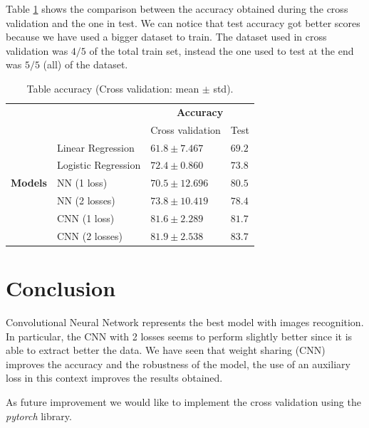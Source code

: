 \documentclass[journal, a4paper]{IEEEtran}
\begin{document}
Table \ref{table:accuracy} shows the comparison between the accuracy obtained during the cross validation and the one in test. We can notice that test accuracy got better scores because we have used a bigger dataset to train. The dataset used in cross validation was $4/5$ of the total train set, instead the one used to test at the end was $5/5$ (all) of the dataset.
\begin{table}
\centering
\caption{Table accuracy (Cross validation: mean $\pm$ std).}
\label{table:accuracy}
\begin{tabular}{|l|l|l|l|} 
\cline{3-4}
\multicolumn{1}{l}{} &                     & \multicolumn{2}{c|}{\textbf{Accuracy}}  \\ 
\cline{3-4}
\multicolumn{1}{l}{} &                     & Cross validation & Test                 \\ 
\hline
                     & Linear Regression   & $61.8\pm7.467$    & $69.2$                 \\ 
\cline{2-4}
     & Logistic Regression & $72.4 \pm0.860$    & $73.8$                 \\ 
\cline{2-4}
\textbf{Models}    & NN (1 loss)~        & $70.5 \pm12.696$   & $80.5$                 \\ 
\cline{2-4}
                     & NN (2 losses)~      & $73.8 \pm10.419$   & $78.4$                 \\ 
\cline{2-4}
                     & CNN (1 loss)~       & $81.6 \pm2.289$    & $81.7$                 \\ 
\cline{2-4}
                     & CNN (2 losses)      & $81.9 \pm2.538$    & $83.7$                 \\
\hline
\end{tabular}
\end{table}

\section{Conclusion}
\label{sec:conclusion}
Convolutional Neural Network represents the best model with images recognition. In particular, the CNN with 2 losses seems to perform slightly better since it is able to extract better the data. We have seen that weight sharing (CNN) improves the accuracy and the robustness of the model, the use of an auxiliary loss in this context improves the results obtained.

As future improvement we would like to implement the cross validation using the \textit{pytorch} library.
\end{document}
